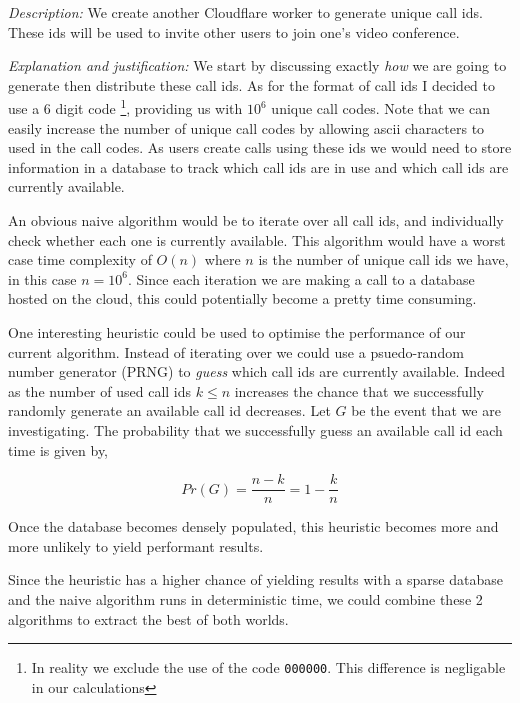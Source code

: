 \textit{Description:} We create another Cloudflare worker to
generate unique call ids. These ids will be used to invite
other users to join one's video conference. \\ \vspace{0.2cm}

\textit{Explanation and justification:} We start by discussing
exactly \textit{how} we are going to generate then distribute
these call ids. As for the format of call ids I decided to
use a 6 digit code \footnote{In reality we exclude the use
of the code \texttt{000000}. This difference is negligable
in our calculations}, providing us with $10^6$ unique call
codes. Note that we can easily increase the number of unique
call codes by allowing ascii characters to used in the call
codes. As users create calls using these ids we would need to
store information in a database to track which call ids are
in use and which call ids are currently available.
\\ \vspace{0.2cm}

An obvious naive algorithm would be to iterate over all call
ids, and individually check whether each one is currently
available. This algorithm would have a worst case time
complexity of $O(n)$ where $n$ is the number of unique call
ids we have, in this case $n = 10^6$. Since each iteration we
are making a call to a database hosted on the cloud, this
could potentially become a pretty time consuming.
\\ \vspace{0.2cm}

One interesting heuristic could be used to optimise the
performance of our current algorithm. Instead of iterating
over we could use a psuedo-random number generator (PRNG) to
\textit{guess} which call ids are currently available. Indeed
as the number of used call ids $k \leq n$ increases the chance
that we successfully randomly generate an available call id
decreases. Let $G$ be the event that we are investigating.
The probability that we successfully guess an available call
id each time is given by,

$$
  Pr(G) = \frac{n-k}{n} = 1 - \frac{k}{n}
$$

Once the database becomes densely populated, this heuristic
becomes more and more unlikely to yield performant results.
\\ \vspace{0.2cm}

Since the heuristic has a higher chance of yielding results
with a sparse database and the naive algorithm runs in
deterministic time, we could combine these 2 algorithms to
extract the best of both worlds. \\ \vspace{0.2cm}


